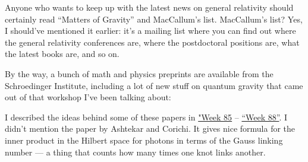 \documentclass{article}
\def\tightlist{}
\renewcommand{\texttt}[1]{%
  \begingroup
  \ttfamily
  \begingroup\lccode`~=`/\lowercase{\endgroup\def~}{/\discretionary{}{}{}}%
  \begingroup\lccode`~=`[\lowercase{\endgroup\def~}{[\discretionary{}{}{}}%
  \begingroup\lccode`~=`.\lowercase{\endgroup\def~}{.\discretionary{}{}{}}%
  \catcode`/=\active\catcode`[=\active\catcode`.=\active
  \scantokens{#1\noexpand}%
  \endgroup
}
\begin{document}
Anyone who wants to keep up with the latest news on general relativity
should certainly read ``Matters of Gravity'' and MacCallum's list.
MacCallum's list? Yes, I should've mentioned it earlier: it's a mailing
list where you can find out where the general relativity conferences
are, where the postdoctoral positions are, what the latest books are,
and so on.


By the way, a bunch of math and physics preprints are available from the
Schroedinger Institute, including a lot of new stuff on quantum gravity
that came out of that workshop I've been talking about:


I described the ideas behind some of these papers in
\protect\hyperlink{week85}{"Week 85} --
\protect\hyperlink{week88}{``Week 88''}. I didn't mention the paper by
Ashtekar and Corichi. It gives nice formula for the inner product in the
Hilbert space for photons in terms of the Gauss linking number --- a
thing that counts how many times one knot links another.
\end{document}
